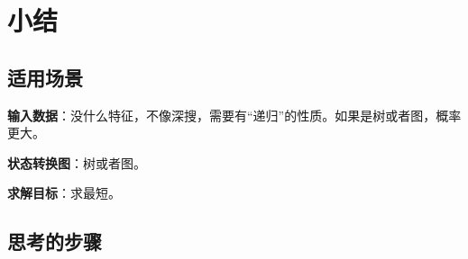 \section{小结} %
\label{sec:bfs-template}


\subsection{适用场景}

\textbf{输入数据}：没什么特征，不像深搜，需要有“递归”的性质。如果是树或者图，概率更大。

\textbf{状态转换图}：树或者图。

\textbf{求解目标}：求最短。


\subsection{思考的步骤}
